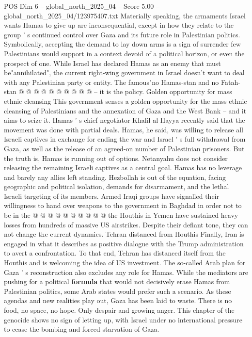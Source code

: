 \begin{textsample}{POS Dim 6 – global\_north\_2025\_04 – Score 5.00 – global\_north\_2025\_04/123975407.txt}
Materially speaking, the armaments Israel wants Hamas to give up are inconsequential, except in how they relate to the group ' s continued control over Gaza and its future role in Palestinian politics.
Symbolically, accepting the demand to lay down arms is a sign of surrender few Palestinians would support in a context devoid of a political horizon, or even the prospect of one.
While Israel has declared Hamas as an enemy that must be"annihilated", the current right-wing government in Israel doesn't want to deal with any Palestinian party or entity.
The famous"no Hamas-stan and no Fatah-stan @ @ @ @ @ @ @ @ @ @ -- it is the policy.
Golden opportunity for mass ethnic cleansing This government senses a golden opportunity for the mass ethnic cleansing of Palestinians and the annexation of Gaza and the West Bank -- and it aims to seize it.
Hamas ' s chief negotiator Khalil al-Hayya recently said that the movement was done with partial deals.
Hamas, he said, was willing to release all Israeli captives in exchange for ending the war and Israel ' s full withdrawal from Gaza, as well as the release of an agreed-on number of Palestinian prisoners.
But the truth is, Hamas is running out of options.
Netanyahu does not consider releasing the remaining Israeli captives as a central goal.
Hamas has no leverage and barely any allies left standing.
Hezbollah is out of the equation, facing geographic and political isolation, demands for disarmament, and the lethal Israeli targeting of its members.
Armed Iraqi groups have signalled their willingness to hand over weapons to the government in Baghdad in order not to be in the @ @ @ @ @ @ @ @ @ @ the Houthis in Yemen have sustained heavy losses from hundreds of massive US airstrikes.
Despite their defiant tone, they can not change the current dynamics.
Tehran distanced from Houthis Finally, Iran is engaged in what it describes as positive dialogue with the Trump administration to avert a confrontation.
To that end, Tehran has distanced itself from the Houthis and is welcoming the idea of US investment.
The so-called Arab plan for Gaza ' s reconstruction also excludes any role for Hamas.
While the mediators are pushing for a political \textbf{formula} that would not decisively erase Hamas from Palestinian politics, some Arab states would prefer such a scenario.
As these agendas and new realities play out, Gaza has been laid to waste.
There is no food, no space, no hope.
Only despair and growing anger.
This chapter of the genocide shows no sign of letting up, with Israel under no international pressure to cease the bombing and forced starvation of Gaza.

\end{textsample}
